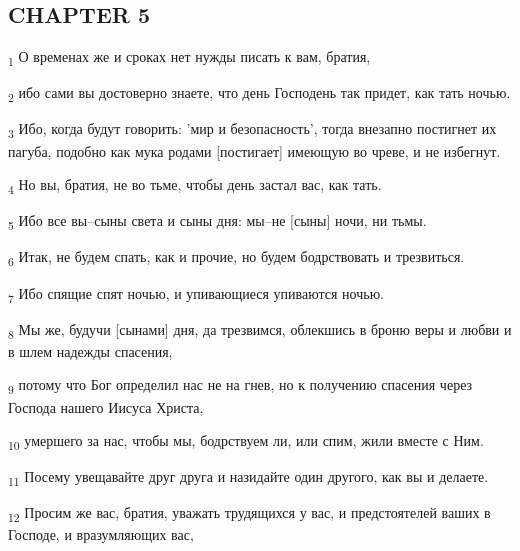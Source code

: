 \subsection{CHAPTER 5}
\begin{tcolorbox}
\textsubscript{1} О временах же и сроках нет нужды писать к вам, братия,
\end{tcolorbox}
\begin{tcolorbox}
\textsubscript{2} ибо сами вы достоверно знаете, что день Господень так придет, как тать ночью.
\end{tcolorbox}
\begin{tcolorbox}
\textsubscript{3} Ибо, когда будут говорить: 'мир и безопасность', тогда внезапно постигнет их пагуба, подобно как мука родами [постигает] имеющую во чреве, и не избегнут.
\end{tcolorbox}
\begin{tcolorbox}
\textsubscript{4} Но вы, братия, не во тьме, чтобы день застал вас, как тать.
\end{tcolorbox}
\begin{tcolorbox}
\textsubscript{5} Ибо все вы--сыны света и сыны дня: мы--не [сыны] ночи, ни тьмы.
\end{tcolorbox}
\begin{tcolorbox}
\textsubscript{6} Итак, не будем спать, как и прочие, но будем бодрствовать и трезвиться.
\end{tcolorbox}
\begin{tcolorbox}
\textsubscript{7} Ибо спящие спят ночью, и упивающиеся упиваются ночью.
\end{tcolorbox}
\begin{tcolorbox}
\textsubscript{8} Мы же, будучи [сынами] дня, да трезвимся, облекшись в броню веры и любви и в шлем надежды спасения,
\end{tcolorbox}
\begin{tcolorbox}
\textsubscript{9} потому что Бог определил нас не на гнев, но к получению спасения через Господа нашего Иисуса Христа,
\end{tcolorbox}
\begin{tcolorbox}
\textsubscript{10} умершего за нас, чтобы мы, бодрствуем ли, или спим, жили вместе с Ним.
\end{tcolorbox}
\begin{tcolorbox}
\textsubscript{11} Посему увещавайте друг друга и назидайте один другого, как вы и делаете.
\end{tcolorbox}
\begin{tcolorbox}
\textsubscript{12} Просим же вас, братия, уважать трудящихся у вас, и предстоятелей ваших в Господе, и вразумляющих вас,
\end{tcolorbox}
